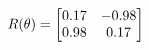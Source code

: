 \documentclass[preview]{standalone}
\begin{document}
\begin{align*}
\special{dvisvgm:raw <g id='unique000'>}R(\theta) = \begin{bmatrix}0.17 & -0.98\\0.98 & 0.17\end{bmatrix}\special{dvisvgm:raw </g>}
\end{align*}
\end{document}
